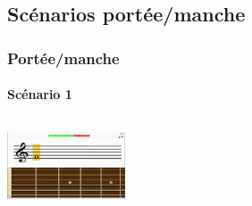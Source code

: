 \documentclass{beamer}
\begin{document}

	\subsection{Scénarios portée/manche}

\begin{frame}

   		\frametitle{Portée/manche}

       		\framesubtitle{Scénario 1}

		\begin{columns}

			 \begin{column}{0.33\textwidth}

				\includegraphics[width=3.5cm]{images/portee_question.png}

			\end{column}

			 \begin{column}{0.33\textwidth}

				
			\end{column}

			 \begin{column}{0.33\textwidth}

				
			\end{column}

		\end{columns} 

	\end{frame}
\end{document}
